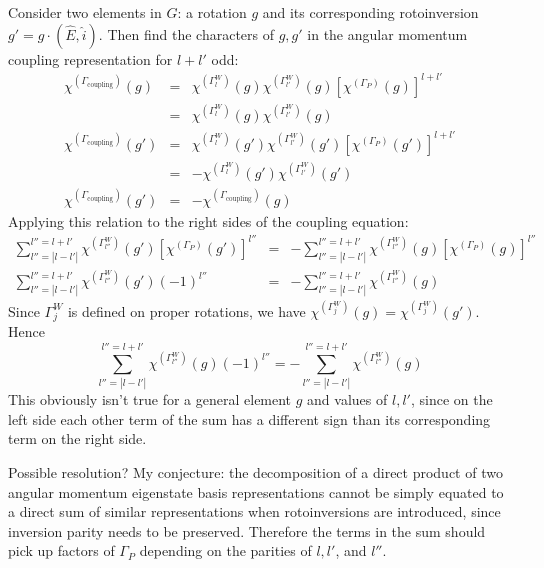 \documentclass[12pt]{article}
\begin{document}
	Consider two elements in $G$: a rotation $g$ and its corresponding rotoinversion $g' = g\cdot (\hat{E}, \hat{i})$. Then find the characters of $g, g'$ in the angular momentum coupling representation for $l+l'$ odd:
	\begin{eqnarray*}
	\chi^{\left(\Gamma_{\text{coupling}}\right)}(g)&=&\chi^{\left(\Gamma^W_{l}\right)}(g)\chi^{\left(\Gamma^W_{l'}\right)}(g)\left[\chi^{\left(\Gamma_P\right)}(g)\right]^{l+l'}\\
	&=&\chi^{\left(\Gamma^W_{l}\right)}(g)\chi^{\left(\Gamma^W_{l'}\right)}(g)\\
	\chi^{\left(\Gamma_{\text{coupling}}\right)}(g')&=&\chi^{\left(\Gamma^W_{l}\right)}(g')\chi^{\left(\Gamma^W_{l'}\right)}(g')\left[\chi^{\left(\Gamma_P\right)}(g')\right]^{l+l'}\\
	&=&-\chi^{\left(\Gamma^W_{l}\right)}(g')\chi^{\left(\Gamma^W_{l'}\right)}(g')\\
	\chi^{\left(\Gamma_{\text{coupling}}\right)}(g')&=&-\chi^{\left(\Gamma_{\text{coupling}}\right)}(g)
	\end{eqnarray*}
	Applying this relation to the right sides of the coupling equation:
	\begin{eqnarray*}		
	\sum_{l''=|l-l'|}^{l''=l+l'} \chi^{\left(\Gamma^W_{l''}\right)}(g')\left[\chi^{\left(\Gamma_P\right)}(g')\right]^{l''}&=&-\sum_{l''=|l-l'|}^{l''=l+l'} \chi^{\left(\Gamma^W_{l''}\right)}(g)\left[\chi^{\left(\Gamma_P\right)}(g)\right]^{l''}\\
	\sum_{l''=|l-l'|}^{l''=l+l'} \chi^{\left(\Gamma^W_{l''}\right)}(g')(-1)^{l''}&=&-\sum_{l''=|l-l'|}^{l''=l+l'} \chi^{\left(\Gamma^W_{l''}\right)}(g)
	\end{eqnarray*}
	Since $\Gamma^W_j$ is defined on proper rotations, we have $\chi^{\left(\Gamma^W_{j}\right)}(g)=\chi^{\left(\Gamma^W_{j}\right)}(g')$. Hence
	$$\sum_{l''=|l-l'|}^{l''=l+l'} \chi^{\left(\Gamma^W_{l''}\right)}(g)(-1)^{l''}=-\sum_{l''=|l-l'|}^{l''=l+l'} \chi^{\left(\Gamma^W_{l''}\right)}(g)$$
	This obviously isn't true for a general element $g$ and values of $l, l'$, since on the left side each other term of the sum has a different sign than its corresponding term on the right side.
	
	Possible resolution? My conjecture: the decomposition of a direct product of two angular momentum eigenstate basis representations cannot be simply equated to a direct sum of similar representations when rotoinversions are introduced, since inversion parity needs to be preserved. Therefore the terms in the sum should pick up factors of $\Gamma_P$ depending on the parities of $l, l'$, and $l''$.
	
\end{document}
